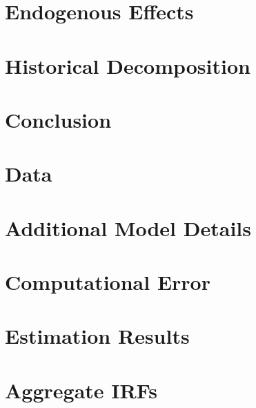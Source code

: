 \documentclass[11pt]{article}
\numberwithin{equation}{section} %
\numberwithin{figure}{section} %
\numberwithin{table}{section} %
\begin{document}
\section{Endogenous Effects} \label{sec:endog-eff}


\section{Historical Decomposition} \label{sec:hist-decomp}


\section{Conclusion} \label{sec:conc}



\newpage
\printbibliography
\FloatBarrier


\newpage
\appendix

\section{Data} \label{app:data}

\FloatBarrier

\section{Additional Model Details} \label{app:mod}

\FloatBarrier

\section{Computational Error} \label{app:comp}

\FloatBarrier

\section{Estimation Results} \label{app:bayes}

\FloatBarrier

\section{Aggregate IRFs} \label{app:agg-irfs}

\FloatBarrier
\end{document}
